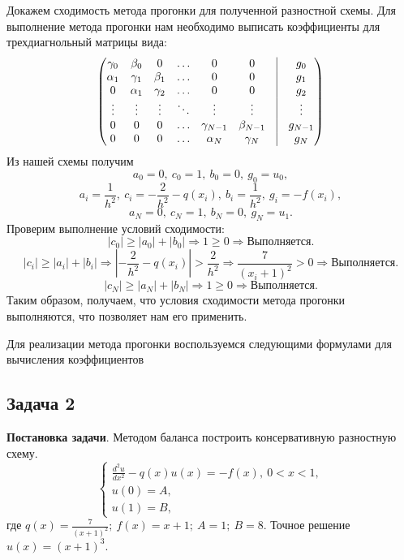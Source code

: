 \documentclass[11pt]{article}
\begin{document}
Докажем сходимость метода прогонки для полученной разностной схемы. Для выполнение метода прогонки нам необходимо выписать коэффициенты для трехдиагнольный матрицы вида:
	\begin{equation}
		\begin{pmatrix} 
			\gamma_0 & \beta_0 & 0 & \ldots & 0 & 0 & \vrule & g_0 \\ 
			\alpha_1 & \gamma_1 & \beta_1 & \ldots & 0 & 0 & \vrule & g_1\\ 
			0 & \alpha_1 & \gamma_2 & \ldots & 0 & 0 & \vrule & g_2\\ 
			\vdots & \vdots & \vdots & \ddots & \vdots & \vdots & \vrule & \vdots\\ 
			0 & 0 & 0 & \ldots& \gamma_{N-1} & \beta_{N-1} & \vrule & g_{N-1} \\ 
			0 & 0 & 0 & \ldots& \alpha_N& \gamma_N & \vrule & g_N\\\end{pmatrix}
	\end{equation}
 Из нашей схемы получим
$$a_0=0,\ c_0=1,\ b_0=0,\ g_0=u_0,$$
$$a_i=\frac{1}{h^2},\ c_i=-\frac{2}{h^2}-q(x_i),\ b_i=\frac{1}{h^2},\ g_i=-f(x_i),$$
$$a_N=0,\ c_N=1,\ b_N=0,\ g_N=u_1.$$
Проверим выполнение условий сходимости:
$$|c_0|\geq |a_0|+|b_0| \Rightarrow 1 \geq 0 \Rightarrow \textit{Выполняется}.$$
$$|c_i|\geq |a_i| + |b_i| \Rightarrow |-\frac{2}{h^2}-q(x_i)|>\frac{2}{h^2} \Rightarrow \frac{7}{(x_i+1)^2} > 0 \Rightarrow \textit{Выполняется}.$$
$$|c_N|\geq |a_N|+|b_N| \Rightarrow 1 \geq 0 \Rightarrow \textit{Выполняется}.$$
Таким образом, получаем, что условия сходимости метода прогонки выполняются, что позволяет нам его применить.

Для реализации метода прогонки воспользуемся следующими формулами для вычисления коэффициентов
\newpage

\subsection*{Задача 2}
\textbf{Постановка задачи}. Методом баланса построить консервативную разностную схему.
    $$\begin{cases}
        \frac{d^2u}{dx^2}-q(x)u(x)=-f(x),\ 0<x<1,\\
        u(0)=A,\\
        u(1)=B,
    \end{cases}$$
где $q(x)=\frac{7}{(x+1)^2};\ f(x)=x+1;\ A=1;\ B=8.$ Точное решение $u(x)=(x+1)^3.$
\end{document}
